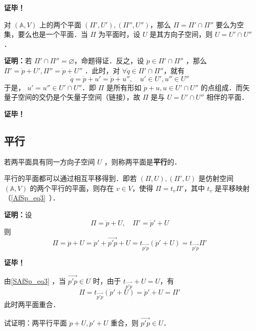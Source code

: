 \textbf{证毕！}
\begin{corollary}{}
对 $(\mathbb A,V)$ 上的两个平面 $(\Pi',U'),(\Pi'',U'')$，那么 $\Pi=\Pi'\cap\Pi''$ 要么为空集，要么也是一个平面．当 $\Pi$ 为平面时，设 $U$ 是其方向子空间，则 $U=U'\cap U''$．
\end{corollary}
\textbf{证明：}若 $\Pi'\cap\Pi''=\varnothing$，命题得证．反之，设 $\dot p\in \Pi'\cap\Pi''$ ，那么 $\Pi'=\dot p+U',\Pi''=\dot p+U''$ ．此时，对 $\forall\dot q\in\Pi'\cap\Pi''$，就有 \begin{equation}
\dot q=\dot p+u'=\dot p+u'',\quad u'\in U',u''\in U''
\end{equation}
于是， $u'=u''\in U'\cap U''$．即 $\Pi$ 是所有形如 $\dot p+u,u\in U'\cap U''$ 的点组成．而矢量子空间的交仍是个矢量子空间（链接），故 $\Pi$ 是与 $U=U'\cap U''$ 相伴的平面．

\textbf{证毕！}
\subsection{平行}

\begin{definition}{}
若两平面具有同一方向子空间 $U$ ，则称两平面是\textbf{平行}的．
\end{definition}
\begin{theorem}{}
平行的平面都可以通过相互平移得到．即若 $(\Pi,U),(\Pi',U)$ 是仿射空间 $(\mathbb A,V)$ 的两个平行的平面，则存在 $v\in V$，使得 $\Pi=t_{v}\Pi'$，其中 $t_v$ 是平移映射（\autoref{AfSp_eq3}~）．
\end{theorem}
\textbf{证明：}设
\begin{equation}
\Pi=\dot p+U,\quad \Pi'=\dot p'+U
\end{equation}
则
\begin{equation}\label{SAfSp_eq3}
\Pi=\dot p+U=\dot p'+\vec{p'p}+U=t_{\vec{p'p}}(\dot p'+U)=t_{\vec{p'p}} \Pi'
\end{equation}

\textbf{证毕！}

由\autoref{SAfSp_eq3} ，当 $\vec{p'p}\in U$ 时，由于 $t_{\vec{p'p}}+U=U$，有
\begin{equation}
\Pi=t_{\vec{p'p}}(\dot p'+U)=\dot p'+U=\Pi'
\end{equation}
此时两平面重合．
\begin{exercise}{}
试证明：两平行平面 $\dot p+U,\dot p'+U$ 重合，则 $\vec{p'p}\in U$．
\end{exercise}
